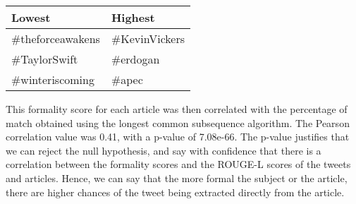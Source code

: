 \begin{table}[htbp]
\centering
\begin{tabular}{|l|l|}
\hline
Lowest  & Highest  \\ \hline
\#theforceawakens       & \#KevinVickers           \\
\#TaylorSwift           & \#erdogan                \\
\#winteriscoming        & \#apec                  \\ \hline
\end{tabular}
\label{tab:formal}
\end{table}

This formality score for each article was then correlated with the percentage of match obtained using the longest common subsequence algorithm. The Pearson correlation value was 0.41, with a p-value of 7.08e-66. The p-value justifies that we can reject the null hypothesis, and say with confidence that there is a correlation between the formality scores and the ROUGE-L scores of the tweets and articles. Hence, we can say that the more formal the subject or the article, there are higher chances of the tweet being extracted directly from the article.
